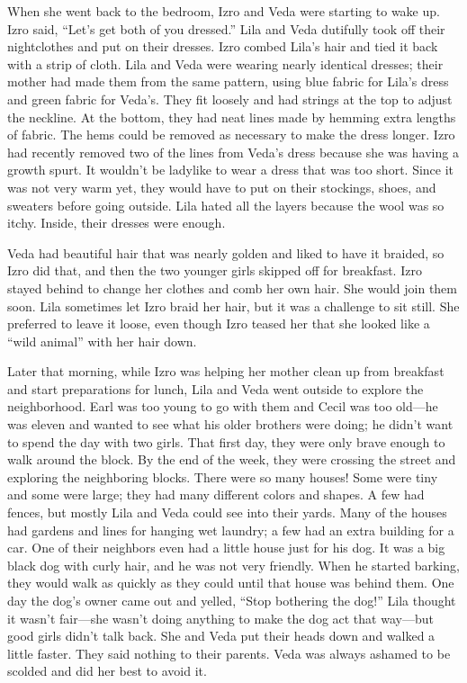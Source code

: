 \documentclass[
  american,
  letterpaper,
]{book}
\begin{document}
When she went back to the bedroom, Izro and Veda were starting to wake
up. Izro said, ``Let's get both of you dressed.'' Lila and Veda
dutifully took off their nightclothes and put on their dresses. Izro
combed Lila's hair and tied it back with a strip of cloth. Lila and Veda
were wearing nearly identical dresses; their mother had made them from
the same pattern, using blue fabric for Lila's dress and green fabric
for Veda's. They fit loosely and had strings at the top to adjust the
neckline. At the bottom, they had neat lines made by hemming extra
lengths of fabric. The hems could be removed as necessary to make the
dress longer. Izro had recently removed two of the lines from Veda's
dress because she was having a growth spurt. It wouldn't be ladylike to
wear a dress that was too short. Since it was not very warm yet, they
would have to put on their stockings, shoes, and sweaters before going
outside. Lila hated all the layers because the wool was so itchy.
Inside, their dresses were enough.

Veda had beautiful hair that was nearly golden and liked to have it
braided, so Izro did that, and then the two younger girls skipped off
for breakfast. Izro stayed behind to change her clothes and comb her own
hair. She would join them soon. Lila sometimes let Izro braid her hair,
but it was a challenge to sit still. She preferred to leave it loose,
even though Izro teased her that she looked like a ``wild animal'' with
her hair down.

Later that morning, while Izro was helping her mother clean up from
breakfast and start preparations for lunch, Lila and Veda went outside
to explore the neighborhood. Earl was too young to go with them and
Cecil was too old---he was eleven and wanted to see what his older
brothers were doing; he didn't want to spend the day with two girls.
That first day, they were only brave enough to walk around the block. By
the end of the week, they were crossing the street and exploring the
neighboring blocks. There were so many houses! Some were tiny and some
were large; they had many different colors and shapes. A few had fences,
but mostly Lila and Veda could see into their yards. Many of the houses
had gardens and lines for hanging wet laundry; a few had an extra
building for a car. One of their neighbors even had a little house just
for his dog. It was a big black dog with curly hair, and he was not very
friendly. When he started barking, they would walk as quickly as they
could until that house was behind them. One day the dog's owner came out
and yelled, ``Stop bothering the dog!'' Lila thought it wasn't
fair---she wasn't doing anything to make the dog act that way---but good
girls didn't talk back. She and Veda put their heads down and walked a
little faster. They said nothing to their parents. Veda was always
ashamed to be scolded and did her best to avoid it.
\end{document}
